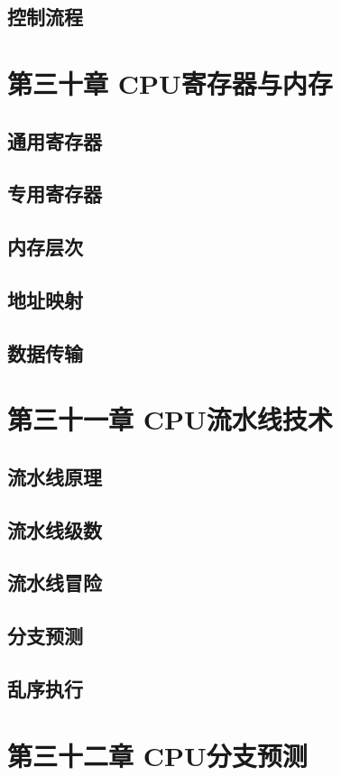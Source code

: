 \documentclass[12pt,UTF8]{ctexbook}
\begin{document}
\section{控制流程}

\chapter{第三十章 CPU寄存器与内存}

\section{通用寄存器}
\section{专用寄存器}
\section{内存层次}
\section{地址映射}
\section{数据传输}

\chapter{第三十一章 CPU流水线技术}

\section{流水线原理}
\section{流水线级数}
\section{流水线冒险}
\section{分支预测}
\section{乱序执行}

\chapter{第三十二章 CPU分支预测}
\end{document}
